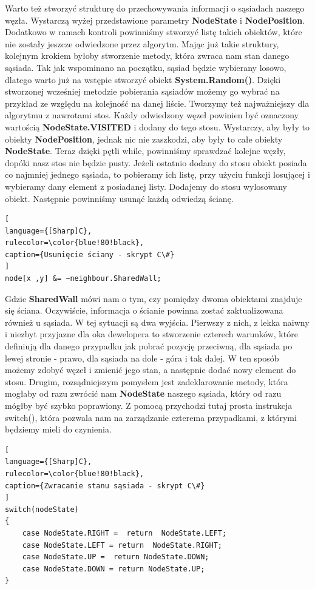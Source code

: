 \documentclass[oneside,polski,logo]{amuthesis}
\begin{document}
Warto też stworzyć strukturę do przechowywania informacji o sąsiadach naszego węzła. Wystarczą wyżej przedstawione parametry \textbf{NodeState} i \textbf{NodePosition}. Dodatkowo w ramach kontroli powinniśmy stworzyć listę takich obiektów, które nie zostały jeszcze odwiedzone przez algorytm. Mając już takie struktury, kolejnym krokiem byłoby stworzenie metody, która zwraca nam stan danego sąsiada. Tak jak wspominano na początku, sąsiad będzie wybierany losowo, dlatego warto już na wstępie stworzyć obiekt \textbf{System.Random()}. Dzięki stworzonej wcześniej metodzie pobierania sąsiadów możemy go wybrać na przykład ze względu na kolejność na danej liście. Tworzymy też najważniejszy dla algorytmu z nawrotami stos. Każdy odwiedzony węzeł powinien być oznaczony wartością \textbf{NodeState.VISITED} i dodany do tego stosu. Wystarczy, aby były to obiekty \textbf{NodePosition}, jednak nic nie zaszkodzi, aby były to całe obiekty \textbf{NodeState}. Teraz dzięki pętli while, powinniśmy sprawdzać kolejne węzły, dopóki nasz stos nie będzie pusty. Jeżeli ostatnio dodany do stosu obiekt posiada co najmniej jednego sąsiada, to pobieramy ich listę, przy użyciu funkcji losującej i wybieramy dany element z posiadanej listy. Dodajemy do stosu wylosowany obiekt.
Następnie powinniśmy usunąć każdą odwiedzą ścianę. 

\begin{lstlisting}[
language={[Sharp]C},
rulecolor=\color{blue!80!black},
caption={Usunięcie ściany - skrypt C\#}
]
node[x ,y] &= ~neighbour.SharedWall;
\end{lstlisting}

Gdzie \textbf{SharedWall} mówi nam o tym, czy pomiędzy dwoma obiektami znajduje się ściana. Oczywiście, informacja o ścianie powinna zostać zaktualizowana również u sąsiada. W tej sytuacji są dwa wyjścia. Pierwszy z nich, z lekka naiwny i niezbyt przyjazne dla oka dewelopera to stworzenie czterech warunków, które definiują dla danego przypadku jak pobrać pozycję przeciwną, dla sąsiada po lewej stronie - prawo, dla sąsiada na dole - góra i tak dalej. W ten sposób możemy zdobyć węzeł i zmienić jego stan, a następnie dodać nowy element do stosu. Drugim, rozsądniejszym pomysłem jest zadeklarowanie metody, która mogłaby od razu zwrócić nam \textbf{NodeState} naszego sąsiada, który od razu mógłby być szybko poprawiony. Z pomocą przychodzi tutaj prosta instrukcja switch(), która pozwala nam na zarządzanie czterema przypadkami, z którymi będziemy mieli do czynienia.

\begin{lstlisting}[
language={[Sharp]C},
rulecolor=\color{blue!80!black},
caption={Zwracanie stanu sąsiada - skrypt C\#}
]
switch(nodeState)
{
	case NodeState.RIGHT =  return  NodeState.LEFT;
	case NodeState.LEFT = return  NodeState.RIGHT;
	case NodeState.UP =  return NodeState.DOWN;
	case NodeState.DOWN = return NodeState.UP;
}
\end{lstlisting}
\end{document}
